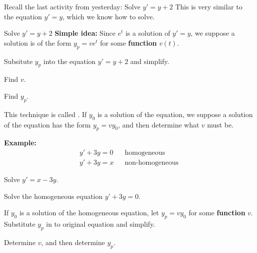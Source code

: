 
\begin{applicationActivities}

\begin{observation}
Recall the last activity from yesterday:
\vfill
Solve \(y'=y+2\)
\vfill
This is very similar to the equation \(y'=y\), which we know how to solve.
\end{observation}

\begin{activity}{15}
Solve \(y'=y+2\)
\vfill
\textbf{Simple idea:} Since \(e^t\) is a solution of \(y'=y\), we suppose a solution is of the form \(y_p =  v e^t\) for some \textbf{function} \(v(t)\). 
\begin{subactivity}
Subsitute \(y_p\) into the equation \(y'=y+2\) and simplify.
\end{subactivity}
\begin{subactivity}
Find \(v\).
\end{subactivity}
\begin{subactivity}
Find \(y_p\).
\end{subactivity}
\end{activity}

\begin{observation}
This technique is called .  If \(y_0\) is a solution of the  equation, we suppose a solution of the  equation has the form \(y_p = v y_0\), and then determine what \(v\) must be. 

\vfill

\textbf{Example: }
\begin{align*}
y'+3y = 0 & & \text{homogeneous} \\
y'+3y = x & & \text{non-homogeneous}
\end{align*}
\end{observation}

\begin{activity}{20}
Solve \(y'=x-3y\).
\begin{subactivity}
Solve the homogeneous equation \(y'+3y=0\).
\end{subactivity}
\begin{subactivity}
If \(y_0\) is a solution of the homogeneous equation, let \(y_p = v y_0 \) for some \textbf{function} \(v\).
Substitute \(y_p\) in to original equation and simplify.
\end{subactivity}
\begin{subactivity}
Determine \(v\), and then determine \(y_p\).
\end{subactivity}
\end{activity}


\end{applicationActivities}
